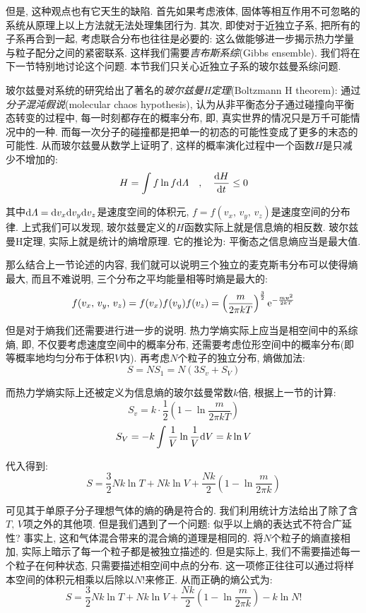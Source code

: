 但是, 这种观点也有它天生的缺陷. 首先如果考虑液体, 固体等相互作用不可忽略的系统从原理上以上方法就无法处理集团行为. 其次, 即使对于近独立子系, 把所有的子系再合到一起, 考虑联合分布也往往是必要的: 这么做能够进一步揭示热力学量与粒子配分之间的紧密联系. 这样我们需要\emph{吉布斯系综}(Gibbs ensemble). 我们将在下一节特别地讨论这个问题. 本节我们只关心近独立子系的玻尔兹曼系综问题.

玻尔兹曼对系统的研究给出了著名的\emph{玻尔兹曼H定理}(Boltzmann H theorem): 通过\emph{分子混沌假说}(molecular chaos hypothesis), 认为从非平衡态分子通过碰撞向平衡态转变的过程中, 每一时刻都存在的概率分布, 即, 真实世界的情况只是万千可能情况中的一种. 而每一次分子的碰撞都是把单一的初态的可能性变成了更多的末态的可能性. 从而玻尔兹曼从数学上证明了, 这样的概率演化过程中一个函数$H$是只减少不增加的:
\[H=\int f\ln f\textrm{d} \varLambda \quad,\quad \frac{\textrm{d} H}{\textrm{d} t}\leq 0\]

其中$\textrm{d} \varLambda=\textrm{d} v_x\textrm{d} v_y\textrm{d} v_z$是速度空间的体积元, $f=f(v_x,\,v_y,\,v_z)$是速度空间的分布律. 上式我们可以发现, 玻尔兹曼定义的$H$函数实际上就是信息熵的相反数. 玻尔兹曼H定理, 实际上就是统计的熵增原理. 它的推论为: 平衡态之信息熵应当是最大值.

那么结合上一节论述的内容, 我们就可以说明三个独立的麦克斯韦分布可以使得熵最大, 而且不难说明, 三个分布之平均能量相等时熵是最大的:
\[f(v_x,\,v_y,\,v_z)=f(v_x)f(v_y)f(v_z)=\left(\frac{m}{2\pi kT}\right)^\frac{3}{2}{\rm e}^{-\frac{m\boldsymbol{v}^2}{2kT}}\]

但是对于熵我们还需要进行进一步的说明. 热力学熵实际上应当是相空间中的系综熵, 即, 不仅要考虑速度空间中的概率分布, 还需要考虑位形空间中的概率分布(即等概率地均匀分布于体积$V$内). 再考虑$N$个粒子的独立分布, 熵做加法:
\[S=NS_1=N\left(3S_v+S_V\right)\]

而热力学熵实际上还被定义为信息熵的玻尔兹曼常数$k$倍, 根据上一节的计算:
\[S_v=k\cdot \frac{1}{2}\left(1-\ln{\frac{m}{2\pi kT}}\right)\]
\[S_V=-k\int \frac{1}{V}\ln \frac{1}{V}\textrm{d} V=k\ln V\]

代入得到:
\[S=\frac{3}{2}Nk\ln T+Nk\ln V+\frac{Nk}{2}\left(1-\ln{\frac{m}{2\pi k}}\right)\]

可见其于单原子分子理想气体的熵的确是符合的. 我们利用统计方法给出了除了含$T,\,V$项之外的其他项. 但是我们遇到了一个问题: 似乎以上熵的表达式不符合广延性? 事实上, 这和气体混合带来的混合熵的道理是相同的. 将$N$个粒子的熵直接相加, 实际上暗示了每一个粒子都是被独立描述的. 但是实际上, 我们不需要描述每一个粒子在何种状态, 只需要描述相空间中点的分布. 这一项修正往往可以通过将样本空间的体积元相乘以后除以$N!$来修正. 从而正确的熵公式为:
\[S=\frac{3}{2}Nk\ln T+Nk\ln V+\frac{Nk}{2}\left(1-\ln{\frac{m}{2\pi k}}\right)-k\ln N!\]

